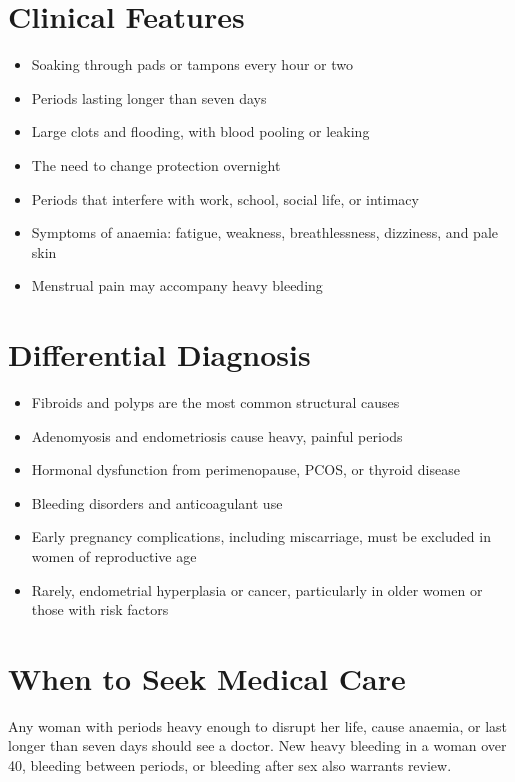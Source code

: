 \section*{Clinical Features}
\begin{itemize}
    \item Soaking through pads or tampons every hour or two
    \item Periods lasting longer than seven days
    \item Large clots and flooding, with blood pooling or leaking
    \item The need to change protection overnight
    \item Periods that interfere with work, school, social life, or intimacy
    \item Symptoms of anaemia: fatigue, weakness, breathlessness, dizziness, and pale skin
    \item Menstrual pain may accompany heavy bleeding
\end{itemize}

\section*{Differential Diagnosis}
\begin{itemize}
    \item Fibroids and polyps are the most common structural causes
    \item Adenomyosis and endometriosis cause heavy, painful periods
    \item Hormonal dysfunction from perimenopause, PCOS, or thyroid disease
    \item Bleeding disorders and anticoagulant use
    \item Early pregnancy complications, including miscarriage, must be excluded in women of reproductive age
    \item Rarely, endometrial hyperplasia or cancer, particularly in older women or those with risk factors
\end{itemize}

\section*{When to Seek Medical Care}
Any woman with periods heavy enough to disrupt her life, cause anaemia, or last longer than seven days should see a doctor. New heavy bleeding in a woman over 40, bleeding between periods, or bleeding after sex also warrants review.

